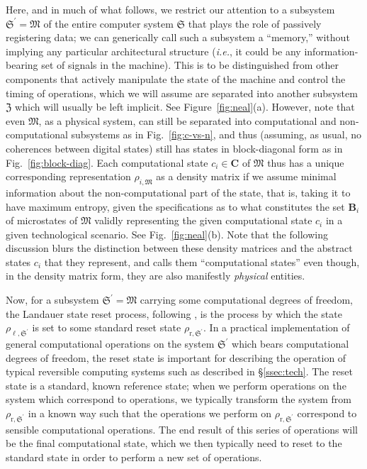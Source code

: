 \documentclass[preprints,article,accept,moreauthors,pdftex]{Definitions/mdpi}
\begin{document}
\begin{paracol}{2}
\switchcolumn

Here, and in much of what follows, we restrict our attention to a subsystem $\mathfrak{S}^{\prime} = \mathfrak{M}$ of the entire computer system $\mathfrak{S}$ that plays the role of passively registering data; we can generically call such a subsystem a ``memory,'' without implying any particular architectural structure ({\em i.e.}, it could be any information-bearing set of signals in the machine).  This is to be distinguished from other components that actively manipulate the state of the machine and control the timing of operations, which we will assume are separated into another subsystem $\mathfrak{Z}$ which will usually be left implicit. See Figure~\ref{fig:neal}(a). However, note that even $\mathfrak{M}$, as a physical system, can still be separated into computational and non-computational subsystems as in Fig.~\ref{fig:c-vs-n}, and thus (assuming, as usual, no coherences between digital states) still has states in block-diagonal form as in Fig.~\ref{fig:block-diag}. Each computational state $c_i\in\boldsymbol{C}$ of $\mathfrak{M}$ thus has a unique corresponding representation $\rho_{i,\mathfrak{M}}$ as a density matrix if we assume minimal information about the non-computational part of the state, that is, taking it to have maximum entropy, given the specifications as to what constitutes the set $\boldsymbol{B}_i$ of microstates of $\mathfrak{M}$ validly representing the given computational state $c_i$ in a given technological scenario. See Fig.~\ref{fig:neal}(b). Note that the following discussion blurs the distinction between these density matrices and the abstract states $c_i$ that they represent, and calls them ``computational states'' even though, in the density matrix form, they are also manifestly \textit{physical} entities.

Now, for a subsystem $\mathfrak{S}^{\prime}=\mathfrak{M}$ carrying some computational degrees of freedom, the Landauer state reset process, following \cite{Anderson19}, is the process by which the state $\rho_{\ell,\mathfrak{S}^{\prime}}$ is set to some standard reset state $\rho_{\mathrm{r},\mathfrak{S}^{\prime}}$. In a practical implementation of general computational operations on the system $\mathfrak{S}^{\prime}$ which bears computational degrees of freedom, the reset state is important for describing the operation of typical reversible computing systems such as described in \S\ref{ssec:tech}. The reset state is a standard, known reference state; when we perform operations on the system which correspond to operations, we typically transform the system from $\rho_{\mathrm{r},\mathfrak{S}^{\prime}}$ in a known way such that the operations we perform on $\rho_{\mathrm{r},\mathfrak{S}^{\prime}}$ correspond to sensible computational operations. The end result of this series of operations will be the final computational state, which we then typically need to reset to the standard state in order to perform a new set of operations.


\end{paracol}
\end{document}
